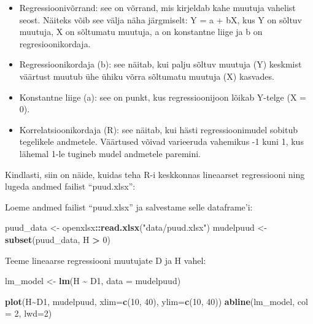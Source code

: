 \documentclass[
]{book}
\newenvironment{Shaded}{\begin{snugshade}}{\end{snugshade}}
\newcommand{\AttributeTok}[1]{\textcolor[rgb]{0.13,0.29,0.53}{#1}}
\newcommand{\DecValTok}[1]{\textcolor[rgb]{0.00,0.00,0.81}{#1}}
\newcommand{\FunctionTok}[1]{\textcolor[rgb]{0.13,0.29,0.53}{\textbf{#1}}}
\newcommand{\NormalTok}[1]{#1}
\newcommand{\OtherTok}[1]{\textcolor[rgb]{0.56,0.35,0.01}{#1}}
\newcommand{\SpecialCharTok}[1]{\textcolor[rgb]{0.81,0.36,0.00}{\textbf{#1}}}
\newcommand{\StringTok}[1]{\textcolor[rgb]{0.31,0.60,0.02}{#1}}
\providecommand{\tightlist}{%
  \setlength{\itemsep}{0pt}\setlength{\parskip}{0pt}}
\renewenvironment{Shaded} {\begin{snugshade}\footnotesize} {\end{snugshade}}
\begin{document}
\begin{itemize}
\tightlist
\item
  Regressioonivõrrand: see on võrrand, mis kirjeldab kahe muutuja vahelist seost. Näiteks võib see välja näha järgmiselt: Y = a + bX, kus Y on sõltuv muutuja, X on sõltumatu muutuja, a on konstantne liige ja b on regresioonikordaja.
\item
  Regressioonikordaja (b): see näitab, kui palju sõltuv muutuja (Y) keskmist väärtust muutub ühe ühiku võrra sõltumatu muutuja (X) kasvades.
\item
  Konstantne liige (a): see on punkt, kus regressioonijoon lõikab Y-telge (X = 0).
\item
  Korrelatsioonikordaja (R): see näitab, kui hästi regressioonimudel sobitub tegelikele andmetele. Väärtused võivad varieeruda vahemikus -1 kuni 1, kus lähemal 1-le tugineb mudel andmetele paremini.
\end{itemize}

Kindlasti, siin on näide, kuidas teha R-i keskkonnas lineaarset regressiooni ning lugeda andmed failist ``puud.xlsx'':

Loeme andmed failist ``puud.xlsx'' ja salvestame selle dataframe'i:

\begin{Shaded}
\begin{Highlighting}[]
\NormalTok{puud\_data }\OtherTok{\textless{}{-}}\NormalTok{ openxlsx}\SpecialCharTok{::}\FunctionTok{read.xlsx}\NormalTok{(}\StringTok{"data/puud.xlsx"}\NormalTok{)}
\NormalTok{mudelpuud }\OtherTok{\textless{}{-}} \FunctionTok{subset}\NormalTok{(puud\_data, H }\SpecialCharTok{\textgreater{}} \DecValTok{0}\NormalTok{)}
\end{Highlighting}
\end{Shaded}

Teeme lineaarse regressiooni muutujate D ja H vahel:

\begin{Shaded}
\begin{Highlighting}[]
\NormalTok{lm\_model }\OtherTok{\textless{}{-}} \FunctionTok{lm}\NormalTok{(H }\SpecialCharTok{\textasciitilde{}}\NormalTok{ D1, }\AttributeTok{data =}\NormalTok{ mudelpuud)}
\end{Highlighting}
\end{Shaded}

\begin{Shaded}
\begin{Highlighting}[]
\FunctionTok{plot}\NormalTok{(H}\SpecialCharTok{\textasciitilde{}}\NormalTok{D1, mudelpuud, }\AttributeTok{xlim=}\FunctionTok{c}\NormalTok{(}\DecValTok{10}\NormalTok{, }\DecValTok{40}\NormalTok{), }\AttributeTok{ylim=}\FunctionTok{c}\NormalTok{(}\DecValTok{10}\NormalTok{, }\DecValTok{40}\NormalTok{))}
\FunctionTok{abline}\NormalTok{(lm\_model, }\AttributeTok{col =} \DecValTok{2}\NormalTok{, }\AttributeTok{lwd=}\DecValTok{2}\NormalTok{)}
\end{Highlighting}
\end{Shaded}
\end{document}
